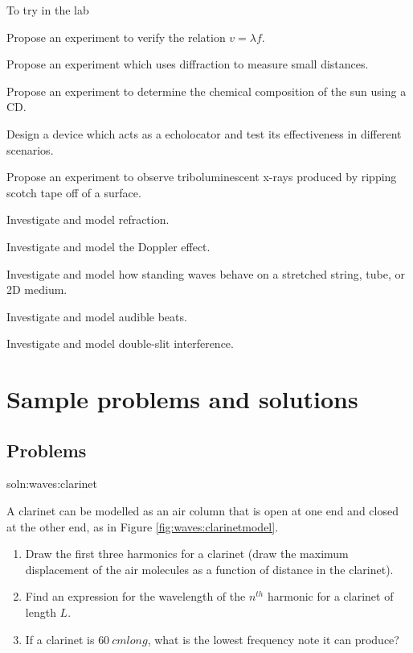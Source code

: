 \begin{chapteractivity}{To try in the lab}
{
\item Propose an experiment to verify the relation $v=\lambda f$.
\item Propose an experiment which uses diffraction to measure small distances.
\item Propose an experiment to determine the chemical composition of the sun using a CD.
\item Design a device which acts as a echolocator and test its effectiveness in different scenarios.
\item Propose an experiment to observe triboluminescent x-rays produced by ripping scotch tape off of a surface.
\item Investigate and model refraction.
\item Investigate and model the Doppler effect.
\item Investigate and model how standing waves behave on a stretched string, tube, or 2D medium.
\item Investigate and model audible beats.
\item Investigate and model double-slit interference.
}
\end{chapteractivity}


\newpage
\section{Sample problems and solutions}
\subsection{Problems}

\begin{problem}{soln:waves:clarinet}{\label{prob:waves:clarinet} A clarinet can be modelled as an air column that is open at one end and closed at the other end, as in Figure \ref{fig:waves:clarinetmodel}.
\begin{enumerate}[label=\alph*),topsep=-10pt]
\item Draw the first three harmonics for a clarinet (draw the maximum displacement of the air molecules as a function of distance in the clarinet).
\item Find an expression for the wavelength of the $n^{th}$ harmonic for a clarinet of length $L$.
\item If a clarinet is $\SI{60}{cm} long$, what is the lowest frequency note it can produce?
\end{enumerate}
}
\end{problem}

